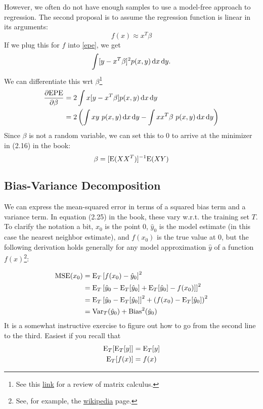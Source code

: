 However, we often do not have enough samples to use a model-free approach to regression. The second proposal is to assume the regression function is linear in its arguments:
$$
f(x) \approx x^T \beta
$$
If we plug this for $f$ into \eqref{epe}, we get
$$
\int [y - x^T \beta]^2 p(x, y) \operatorname{d}\!{x} \operatorname{d}\!{y}.
$$
We can differentiate this wrt $\beta$\footnote{See this \href{https://www.matrixcalculus.org/}{link} for a review of matrix calculus.}
\begin{align*}
  \frac{\partial \mathrm{EPE}}{\partial \beta} &= 2 \int x [y - x^T \beta] p(x, y) \d x \d y\\
                                               &= 2\left(\int x y\ p(x, y)\d x \d y - \int xx^T\beta\ p(x, y) \d x \d y\right)
\end{align*}
Since $\beta$ is not a random variable, we can set this to $0$ to arrive at the minimizer in (2.16) in the book:
$$
\beta = [\mathrm{E} (XX^T)]^{-1} \mathrm{E} (XY)
$$

\subsection{Bias-Variance Decomposition}

We can express the mean-squared error in terms of a squared bias term and a variance term. In equation (2.25) in the book, these vary w.r.t. the training set $T$. To clarify the notation a bit, 
$x_0$ is the point $0$, $\hat{y}_0$ is the model estimate (in this case the nearest neighbor estimate), and $f(x_0)$ is the true value at $0$, but the following derivation holds generally for any model approximation $\hat{y}$ of a function $f(x)$\footnote{See, for example, the \href{https://en.wikipedia.org/wiki/Bias-variance_tradeoff}{wikipedia} page.}:

\begin{align*}
  \mathrm{MSE}(x_0) &= \mathrm{E}_{T}\left[f(x_0) - \hat{y}_0\right]^2\\
                    &= \mathrm{E}_{T}\left[\hat{y}_0 - \mathrm{E}_{T}[\hat{y}_0] + \mathrm{E}_{T}[\hat{y}_0] - f(x_0)]\right]^2\\
                    &= \mathrm{E}_{T}\left[\hat{y}_0 - \mathrm{E}_{T}[\hat{y}_0]\right]^2 + \left(f(x_0) - \mathrm{E}_{T}[\hat{y}_0]\right)^2\\
                    &= \mathrm{Var}_{T}(\hat{y}_0) + \mathrm{Bias}^2(\hat{y}_0)
\end{align*}
It is a somewhat instructive exercise to figure out how to go from the second line to the third. Easiest if you recall that
\begin{align*}
  \mathrm{E}_{T}[\mathrm{E}_{T}[y]] &= \mathrm{E}_{T}[y]\\
\mathrm{E}_{T}[f(x)] &= f(x)
\end{align*}

